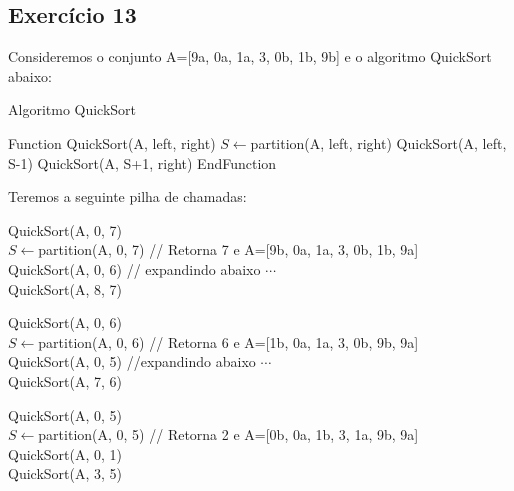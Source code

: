 \subsection{Exercício 13}\label{sec:exer13}

Consideremos o conjunto A=[9a, 0a, 1a, 3, 0b, 1b, 9b] e o algoritmo QuickSort
abaixo:

\begin{algorithm}
  \caption{Algoritmo QuickSort}
  \begin{algorithmic}
    \STATE Function QuickSort(A, left, right)
      \STATE $S \leftarrow $partition(A, left, right)
      \STATE QuickSort(A, left, S-1)
      \STATE QuickSort(A, S+1, right)
    \STATE EndFunction
  \end{algorithmic}
\end{algorithm}

Teremos a seguinte pilha de chamadas: \\
\begin{tabbing}
QuickSort(A, 0, 7) \\
  \hspace{1em}$S \leftarrow $partition(A, 0, 7) // Retorna 7 e A=[9b, 0a, 1a, 3, 0b, 1b, 9a] \\
  \hspace{1em}QuickSort(A, 0, 6) // expandindo abaixo $\cdots $\\
  \hspace{1em}QuickSort(A, 8, 7)
\end{tabbing}

\begin{tabbing}
QuickSort(A, 0, 6) \\
  \hspace{1em}$S \leftarrow $partition(A, 0, 6) // Retorna 6 e A=[1b, 0a, 1a, 3, 0b, 9b, 9a] \\
  \hspace{1em}QuickSort(A, 0, 5) //expandindo abaixo $\cdots$ \\
  \hspace{1em}QuickSort(A, 7, 6)
\end{tabbing}

\begin{tabbing}
QuickSort(A, 0, 5) \\
  \hspace{1em}$S \leftarrow $partition(A, 0, 5) // Retorna 2 e A=[0b, 0a, 1b, 3, 1a, 9b, 9a] \\
  \hspace{1em}QuickSort(A, 0, 1)  \\
  \hspace{1em}QuickSort(A, 3, 5)
\end{tabbing}

